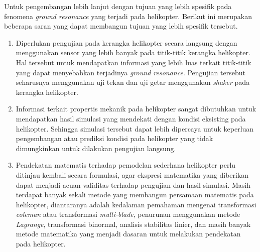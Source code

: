Untuk pengembangan lebih lanjut dengan tujuan yang lebih spesifik pada fenomena \textit{ground resonance} yang terjadi pada helikopter. Berikut ini merupakan beberapa saran yang dapat membangun tujuan yang lebih spesifik tersebut.

\begin{enumerate}[nolistsep]

  \item Diperlukan pengujian pada kerangka helikopter secara langsung dengan menggunakan sensor yang lebih banyak pada titik-titik kerangka helikopter. Hal tersebut untuk mendapatkan informasi yang lebih luas terkait titik-titik yang dapat menyebabkan terjadinya \textit{ground resonance}. Pengujian tersebut seharusnya menggunakan uji tekan dan uji getar menggunakan \textit{shaker} pada kerangka helikopter.

  \item Informasi terkait propertis mekanik pada helikopter sangat dibutuhkan untuk mendapatkan hasil simulasi yang mendekati dengan kondisi eksisting pada helikopter. Sehingga simulasi tersebut dapat lebih dipercaya untuk keperluan pengembangan atau prediksi kondisi pada helikopter yang tidak dimungkinkan untuk dilakukan pengujian langsung.

  \item Pendekatan matematis terhadap pemodelan sederhana helikopter perlu ditinjau kembali secara formulasi, agar ekspresi matematika yang diberikan dapat menjadi acuan validitas terhadap pengujian dan hasil simulasi. Masih terdapat banyak sekali metode yang membangun persamaan matematis pada helikopter, diantaranya adalah kedalaman pemahaman mengenai transformasi \textit{coleman} atau transformasi \textit{multi-blade}, penurunan menggunakan metode \textit{Lagrange}, transformasi binormal, analisis stabilitas linier, dan masih banyak metode matematika yang menjadi dasaran untuk melakukan pendekatan pada helikopter.

\end{enumerate}
